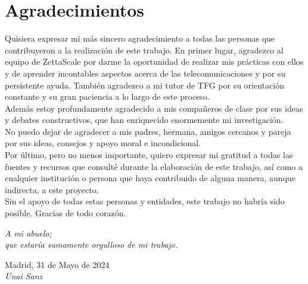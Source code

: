 \cleardoublepage

\chapter*{Agradecimientos}

Quisiera expresar mi más sincero agradecimiento a todas las personas que
contribuyeron a la realización de este trabajo. En primer lugar, agradezco al
equipo de ZettaScale por darme la oportunidad de realizar mis prácticas con
ellos y de aprender incontables aspectos acerca de las telecomunicaciones y por
su persistente ayuda. También agradezco a mi tutor de TFG por su orientación
constante y su gran paciencia a lo largo de este proceso.\\

Además estoy profundamente agradecido a mis compañeros de clase por sus ideas y
debates constructivos, que han enriquecido enormemente mi investigación.\\

No puedo dejar de agradecer a mis padres, hermana, amigos cercanos y pareja por
sus ideas, consejos y apoyo moral e incondicional.\\

Por último, pero no menos importante, quiero expresar mi gratitud a todas las
fuentes y recursos que consulté durante la elaboración de este trabajo, así como
a cualquier institución o persona que haya contribuido de alguna manera, aunque
indirecta, a este proyecto.\\

Sin el apoyo de todas estas personas y entidades, este trabajo no habría sido
posible. Gracias de todo corazón.\\


\begin{flushright}
		\vspace{1.5 cm}
		\emph{A mi abuelo;\\
      		  que estaría sumamente orgulloso de mi trabajo.}\\
		\par
		\vspace{1.0 cm}
		Madrid, 31 de Mayo de 2024\\ %
		\emph{Unai Sanz}
\end{flushright}

\thispagestyle{empty}

